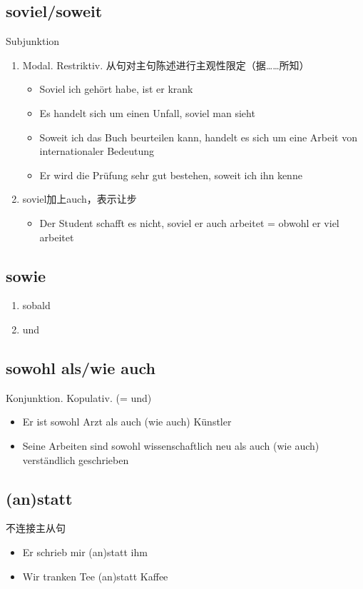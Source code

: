\documentclass[UTF8]{report}
\begin{document}
\subsection{soviel/soweit}
Subjunktion

\begin{enumerate}
    \item Modal. Restriktiv. 从句对主句陈述进行主观性限定（据……所知）
    
    \begin{itemize}
        \item Soviel ich gehört habe, ist er krank
        \item Es handelt sich um einen Unfall, soviel man sieht
        \item Soweit ich das Buch beurteilen kann, handelt es sich um eine Arbeit von internationaler Bedeutung
        \item Er wird die Prüfung sehr gut bestehen, soweit ich ihn kenne
    \end{itemize}
    \item soviel加上auch，表示让步
    \begin{itemize}
        \item Der Student schafft es nicht, soviel er auch arbeitet = obwohl er viel arbeitet
    \end{itemize}
\end{enumerate}

\subsection{sowie}
\begin{enumerate}
    \item sobald
    \item und
\end{enumerate}

\subsection{sowohl als/wie auch}
Konjunktion. Kopulativ. (= und)
\begin{itemize}
    \item Er ist sowohl Arzt als auch (wie auch) Künstler
    \item Seine Arbeiten sind sowohl wissenschaftlich neu als auch (wie auch) verständlich geschrieben
\end{itemize}


\subsection{(an)statt}
不连接主从句
\begin{itemize}
    \item Er schrieb mir (an)statt ihm
    \item Wir tranken Tee (an)statt Kaffee
\end{itemize}
\end{document}
